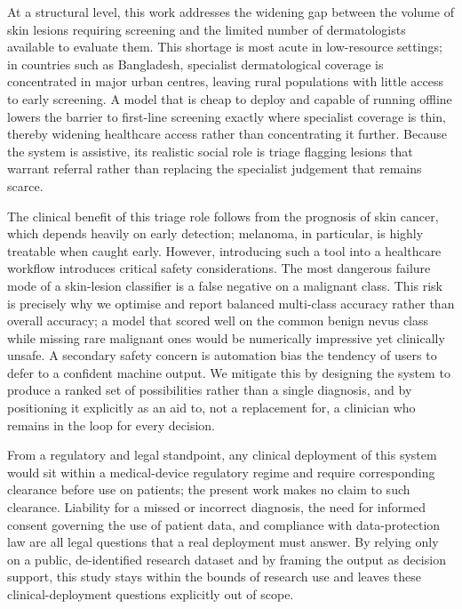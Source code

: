 At a structural level, this work addresses the widening gap between the volume of skin lesions requiring screening and the limited number of dermatologists available to evaluate them. This shortage is most acute in low-resource settings; in countries such as Bangladesh, specialist dermatological coverage is concentrated in major urban centres, leaving rural populations with little access to early screening. A model that is cheap to deploy and capable of running offline lowers the barrier to first-line screening exactly where specialist coverage is thin, thereby widening healthcare access rather than concentrating it further. Because the system is assistive, its realistic social role is triage flagging lesions that warrant referral rather than replacing the specialist judgement that remains scarce.

The clinical benefit of this triage role follows from the prognosis of skin cancer, which depends heavily on early detection; melanoma, in particular, is highly treatable when caught early. However, introducing such a tool into a healthcare workflow introduces critical safety considerations. The most dangerous failure mode of a skin-lesion classifier is a false negative on a malignant class. This risk is precisely why we optimise and report balanced multi-class accuracy rather than overall accuracy; a model that scored well on the common benign nevus class while missing rare malignant ones would be numerically impressive yet clinically unsafe. A secondary safety concern is automation bias the tendency of users to defer to a confident machine output. We mitigate this by designing the system to produce a ranked set of possibilities rather than a single diagnosis, and by positioning it explicitly as an aid to, not a replacement for, a clinician who remains in the loop for every decision.

From a regulatory and legal standpoint, any clinical deployment of this system would sit within a medical-device regulatory regime and require corresponding clearance before use on patients; the present work makes no claim to such clearance. Liability for a missed or incorrect diagnosis, the need for informed consent governing the use of patient data, and compliance with data-protection law are all legal questions that a real deployment must answer. By relying only on a public, de-identified research dataset and by framing the output as decision support, this study stays within the bounds of research use and leaves these clinical-deployment questions explicitly out of scope.


